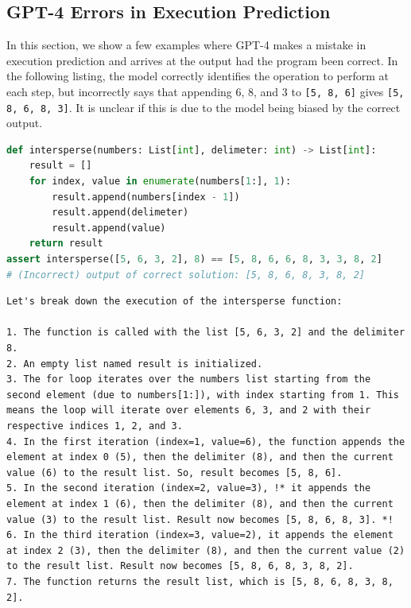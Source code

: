 \subsection{GPT-4 Errors in Execution Prediction} \label{appendix:gpt4-execution-errors}
In this section, we show a few examples where GPT-4 makes a mistake in execution prediction and arrives at the output had the program been correct. In the following listing, the model correctly identifies the operation to perform at each step, but incorrectly says that appending 6, 8, and 3 to \texttt{[5, 8, 6]} gives \texttt{[5, 8, 6, 8, 3]}. It is unclear if this is due to the model being biased by the correct output.
\newline
\begin{lstlisting}[language=Python, frame=single]
def intersperse(numbers: List[int], delimeter: int) -> List[int]:
    result = []
    for index, value in enumerate(numbers[1:], 1):
        result.append(numbers[index - 1])
        result.append(delimeter)
        result.append(value)
    return result
assert intersperse([5, 6, 3, 2], 8) == [5, 8, 6, 6, 8, 3, 3, 8, 2]
# (Incorrect) output of correct solution: [5, 8, 6, 8, 3, 8, 2]
\end{lstlisting}

\begin{lstlisting}[frame=single, belowskip=20pt]
Let's break down the execution of the intersperse function:

1. The function is called with the list [5, 6, 3, 2] and the delimiter 8.
2. An empty list named result is initialized.
3. The for loop iterates over the numbers list starting from the second element (due to numbers[1:]), with index starting from 1. This means the loop will iterate over elements 6, 3, and 2 with their respective indices 1, 2, and 3.
4. In the first iteration (index=1, value=6), the function appends the element at index 0 (5), then the delimiter (8), and then the current value (6) to the result list. So, result becomes [5, 8, 6].
5. In the second iteration (index=2, value=3), !* it appends the element at index 1 (6), then the delimiter (8), and then the current value (3) to the result list. Result now becomes [5, 8, 6, 8, 3]. *!
6. In the third iteration (index=3, value=2), it appends the element at index 2 (3), then the delimiter (8), and then the current value (2) to the result list. Result now becomes [5, 8, 6, 8, 3, 8, 2].
7. The function returns the result list, which is [5, 8, 6, 8, 3, 8, 2].
\end{lstlisting}

